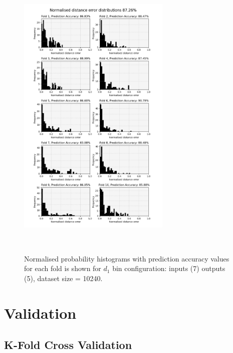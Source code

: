 \begin{figure}[!b]
    \centering
    \includegraphics[width=0.65\textwidth]{figures/validation_plots/TE/k-fold_two_outputs.png}
    \caption{\small Normalised probability histograms with prediction accuracy values for each fold is shown for $d_{1}$ bin configuration: inputs (7) outputs (5), dataset size = 10240.}~\label{fig:k-foldhistogramsTE}
\end{figure}
\newpage
\section{Validation}\label{appendix:prediction_accuracy}
\subsection{K-Fold Cross Validation}
\newpage




